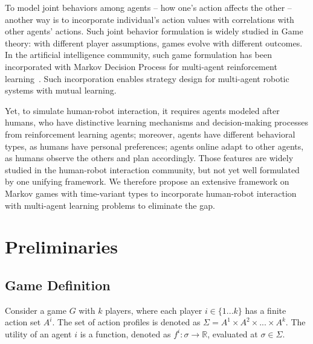 \documentclass[letterpaper, 10 pt, conference]{ieeeconf}  %
\begin{document}
To model joint behaviors among agents -- how one's action affects the other -- another way is to incorporate individual's action values with correlations 
with other agents' actions. Such joint behavior formulation is widely studied 
in Game theory: with different player assumptions, games evolve with different 
outcomes. In the artificial intelligence community, such game 
formulation has been incorporated with Markov Decision Process for multi-agent 
reinforcement learning~\cite{littman1994markov}. Such incorporation enables strategy 
design for multi-agent robotic systems with mutual learning. 

Yet, to simulate human-robot interaction, it requires agents modeled after 
humans, who have distinctive learning mechanisms and decision-making processes 
from reinforcement learning agents; moreover, agents have different behavioral 
types, as humans have personal preferences; agents online adapt to other 
agents, as humans observe the others and plan accordingly. Those features are 
widely studied in the human-robot interaction community, but not yet well 
formulated by one unifying framework. We therefore propose 
an extensive framework on Markov games with time-variant types to incorporate 
human-robot interaction with multi-agent learning problems to eliminate the gap. 






\vspace{-.3em}
\section{Preliminaries}
\vspace{-.2em}
\subsection{Game Definition}
\vspace{-.2em}
Consider a game $G$ with $k$ players, where each player $i \in \{1...k\}$ has 
a finite action set $A^i$. The set of action profiles is denoted as 
$\Sigma = A^1 \times A^2 \times ... \times A^k$. The utility of an 
agent $i$ is a function, denoted as $f^i: \sigma \rightarrow \mathbb{R} $, 
evaluated at $\sigma \in \Sigma$. 
\end{document}
